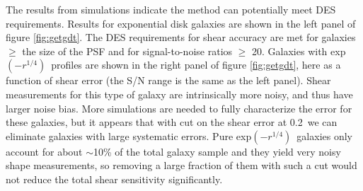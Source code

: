 \documentclass[12pt]{article}
\newcommand{\devprof}{exp$(-r^{1/4})$}
\newcommand{\errcut}{0.2}
\begin{document}
The results from simulations indicate the method can potentially meet DES
requirements.  Results for exponential disk galaxies are shown in the left
panel of figure \ref{fig:getgdt}.  The DES requirements for shear accuracy are
met for galaxies $\geq$ the size of the PSF and for signal-to-noise ratios
$\geq$ 20.  Galaxies with \devprof\ profiles are shown in the right panel of
figure \ref{fig:getgdt}, here as a function of shear error (the S/N range is
the same as the left panel).  Shear measurements for this type of galaxy are
intrinsically more noisy, and thus have larger noise bias.  More simulations
are needed to fully characterize the error for these galaxies, but it appears
that with cut on the shear error at \errcut\ we can eliminate
galaxies with large systematic errors.  Pure \devprof\ galaxies only account
for about $\sim$10\% of the total galaxy sample and they yield very noisy shape
measurements, so removing a large fraction of them with such a cut would not
reduce the total shear sensitivity significantly.
\end{document}
